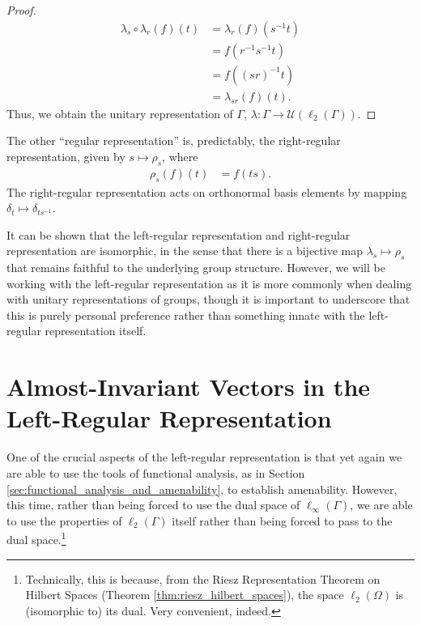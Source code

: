\begin{proof}
\begin{align*}
    \lambda_{s}\circ \lambda_r\left( f \right)\left( t \right) &= \lambda_{r}\left( f \right)\left( s^{-1}t \right)\\
                                                               &= f\left( r^{-1}s^{-1}t \right)\\
                                                               &= f\left( \left( sr \right)^{-1}t \right)\\
                                                               &= \lambda_{sr}\left( f \right)\left( t \right).
  \end{align*}
  Thus, we obtain the unitary representation of $\Gamma$, $\lambda\colon\Gamma\rightarrow \mathcal{U}\left( \ell_2\left( \Gamma \right) \right)$.
\end{proof}
\begin{remark}
  The other ``regular representation'' is, predictably, the right-regular representation, given by $s \mapsto \rho_s$, where
  \begin{align*}
    \rho_s\left( f \right)\left( t \right) &= f\left( ts \right).
  \end{align*}
  The right-regular representation acts on orthonormal basis elements by mapping $\delta_t \mapsto \delta_{ts^{-1}}$.\newline

  It can be shown that the left-regular representation and right-regular representation are isomorphic, in the sense that there is a bijective map $\lambda_s\mapsto \rho_s$ that remains faithful to the underlying group structure. However, we will be working with the left-regular representation as it is more commonly when dealing with unitary representations of groups, though it is important to underscore that this is purely personal preference rather than something innate with the left-regular representation itself.
\end{remark}
\section{Almost-Invariant Vectors in the Left-Regular Representation}%
One of the crucial aspects of the left-regular representation is that yet again we are able to use the tools of functional analysis, as in Section \ref{sec:functional_analysis_and_amenability}, to establish amenability. However, this time, rather than being forced to use the dual space of $\ell_{\infty}\left(\Gamma\right)$, we are able to use the properties of $\ell_2\left( \Gamma \right)$ itself rather than being forced to pass to the dual space.\footnote{Technically, this is because, from the Riesz Representation Theorem on Hilbert Spaces (Theorem \ref{thm:riesz_hilbert_spaces}), the space $\ell_2(\Omega)$ is (isomorphic to) its dual. Very convenient, indeed.}\newline

